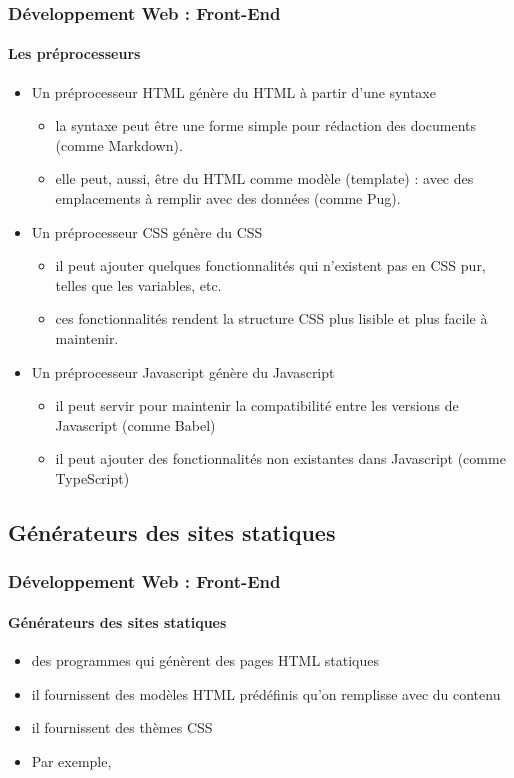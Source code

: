 \documentclass[xcolor=table]{beamer}
\begin{document}
\begin{frame}
\frametitle{Développement Web : Front-End}
\framesubtitle{Les préprocesseurs}

\begin{itemize}
	\item Un préprocesseur HTML génère du HTML à partir d'une syntaxe
	\begin{itemize}
		\item la syntaxe peut être une forme simple pour rédaction des documents (comme Markdown). 
		\item elle peut, aussi, être du HTML comme modèle (template) : avec des emplacements à remplir avec des données (comme Pug).
	\end{itemize}
	\item Un préprocesseur CSS génère du CSS
	\begin{itemize}
		\item il peut ajouter quelques fonctionnalités qui n'existent pas en CSS pur, telles que les variables, etc. 
		\item ces fonctionnalités rendent la structure CSS plus lisible et plus facile à maintenir.
	\end{itemize}
	\item Un préprocesseur Javascript génère du Javascript
	\begin{itemize}
		\item il peut servir pour maintenir la compatibilité entre les versions de Javascript (comme Babel)
		\item il peut ajouter des fonctionnalités non existantes dans Javascript (comme TypeScript)
	\end{itemize}
\end{itemize}

\end{frame}


\subsection{Générateurs des sites statiques}

\begin{frame}
\frametitle{Développement Web : Front-End}
\framesubtitle{Générateurs des sites statiques}

\begin{itemize}
	\item des programmes qui génèrent des pages HTML statiques
	\item il fournissent des modèles HTML prédéfinis qu'on remplisse avec du contenu
	\item il fournissent des thèmes CSS 
	\item Par exemple, 
\end{itemize}

\end{frame}
\end{document}
